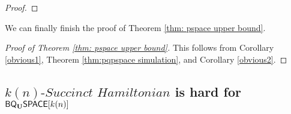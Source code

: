 \documentclass[11pt]{article}
\newtheorem{corollary}[theorem]{Corollary}
\theoremstyle{definition}
\theoremstyle{remark}
\theoremstyle{definition}
\newcommand\spechamiltonian[1]{#1\textit{-Succinct Hamiltonian}}
\newcommand{\classfont}{\sf}
\newcommand{\Unitary}{\mathbf{U}}
\newcommand{\unitaryQSPACE}[3]{{\classfont{Q}_\Unitary\classfont{SPACE}}[#1](#2,#3)}
\newcommand{\unitaryBQSPACE}[1]{{\classfont{BQ}_\Unitary\classfont{SPACE}}[#1]}
\begin{document}
\begin{proof}
\end{proof}

We can finally finish the proof of Theorem \ref{thm: pspace upper bound}.
\begin{proof}[Proof of Theorem \ref{thm: pspace upper bound}]
This follows from Corollary \ref{obvious1}, Theorem \ref{thm:pqpspace simulation}, and Corollary \ref{obvious2}.
\end{proof}

%

\subsection{$\spechamiltonian{k(n)}$ is hard for $\unitaryBQSPACE{k(n)}$}
\end{document}
